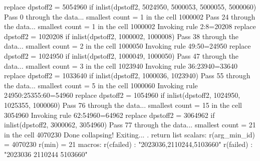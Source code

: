   replace dpstoff2 = 5054960 if inlist(dpstoff2, 5024950, 5000053, 5000055, 5000060)
Pass 0 through the data...
  smallest count = 1 in the cell      1000002
Pass 24 through the data...
  smallest count = 1 in the cell      1000002
  Invoking rule 2:8=20208
  replace dpstoff2 = 1020208 if inlist(dpstoff2, 1000002, 1000008)
\smallskip
\oom
\smallskip
Pass 38 through the data...
  smallest count = 2 in the cell      1000050
  Invoking rule 49:50=24950
  replace dpstoff2 = 1024950 if inlist(dpstoff2, 1000049, 1000050)
\smallskip
\oom
\smallskip
Pass 47 through the data...
  smallest count = 3 in the cell      1023940
  Invoking rule 36:23940=33640
  replace dpstoff2 = 1033640 if inlist(dpstoff2, 1000036, 1023940)
\smallskip
\oom
\smallskip
Pass 55 through the data...
  smallest count = 5 in the cell      1000060
  Invoking rule 24950:25355:60=54960
  replace dpstoff2 = 1054960 if inlist(dpstoff2, 1024950, 1025355, 1000060)
\smallskip
\oom
\smallskip
Pass 76 through the data...
  smallest count = 15 in the cell      3054960
  Invoking rule 62:54960=64962
  replace dpstoff2 = 3064962 if inlist(dpstoff2, 3000062, 3054960)
Pass 77 through the data...
  smallest count = 21 in the cell      4070230
  Done collapsing! Exiting...
{\smallskip}
. return list
{\smallskip}
scalars:
         r(arg_min_id) =  4070230
                r(min) =  21
{\smallskip}
macros:
            r(cfailed) : "2023036,2110244,5103660"
             r(failed) : "2023036 2110244 5103660"
